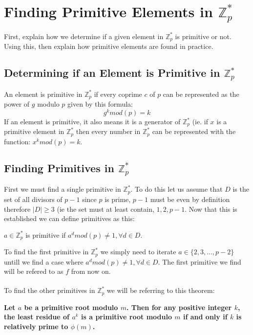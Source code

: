 \documentclass[12pt, letterpaper]{article}
\begin{document}
\section{Finding Primitive Elements in $\mathbb{Z}_p^*$}

First, explain how we determine if a given element in $\mathbb{Z}_p^*$ is primitive or not. 
Using this, then explain how primitive elements are found in practice. 

\subsection{Determining if an Element is Primitive in  $\mathbb{Z}_p^*$}
An element is primitive in  $\mathbb{Z}_p^*$ if every coprime $c$ of $p$ can be represented as the power of $g$ modulo $p$ given by this formula: $$g^k mod(p) = k$$ If an element is primitive, it also means it is a generator of $\mathbb{Z}_p^*$ (ie. if $x$ is a primitive element in  $\mathbb{Z}_p^*$ then every number in  $\mathbb{Z}_p^*$ can be represented with the function: $x^k mod(p) = k$.

\subsection{Finding Primitives in $\mathbb{Z}_p^*$}
First we must find a single primitive in $\mathbb{Z}_p^*$. To do this let us assume that $D$ is the set of all divisors of $p-1$ since $p$ is prime, $p-1$ must be even by definition therefore $|D| \geq 3$ (ie the set must at least contain, $1, 2, p-1$. Now that this is established we can define primitives as this:
\begin{center} 
	$a \in \mathbb{Z}_p^*$ is primitive if $a^d mod(p) \neq 1, \forall d \in D$.
\end{center}
To find the first primitive in $\mathbb{Z}_p^*$ we simply need to iterate $a \in \{2, 3, ... , p-2\}$ untill we find a case where $a^d mod(p) \neq 1, \forall d \in D$. The first primitive we find will be refered to as $f$ from now on.
~\\~\\
To find the other primitives in $\mathbb{Z}_p^*$ we will be referring to this theorem:

\begin{center}
\textbf{Let $a$ be a primitive root modulo $m$. Then for any positive integer $k$, the least residue of $a^k$ is a primitive root modulo $m$ if and only if $k$ is relatively prime to $\phi(m)$.}
\end{center}
\end{document}
